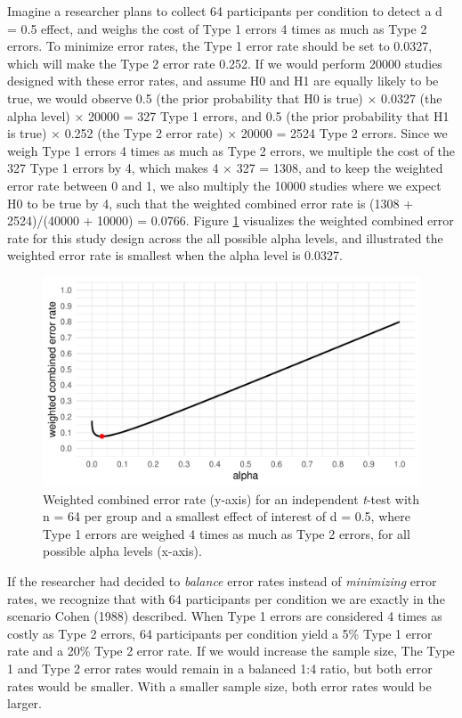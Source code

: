 \documentclass[
  english,
  ,man, a4paper,floatsintext]{apa6}
\begin{document}
Imagine a researcher plans to collect 64 participants per condition to detect a d = 0.5 effect, and weighs the cost of Type 1 errors 4 times as much as Type 2 errors. To minimize error rates, the Type 1 error rate should be set to 0.0327, which will make the Type 2 error rate 0.252. If we would perform 20000 studies designed with these error rates, and assume H0 and H1 are equally likely to be true, we would observe 0.5 (the prior probability that H0 is true) × 0.0327 (the alpha level) × 20000 = 327 Type 1 errors, and 0.5 (the prior probability that H1 is true) × 0.252 (the Type 2 error rate) × 20000 = 2524 Type 2 errors. Since we weigh Type 1 errors 4 times as much as Type 2 errors, we multiple the cost of the 327 Type 1 errors by 4, which makes 4 × 327 = 1308, and to keep the weighted error rate between 0 and 1, we also multiply the 10000 studies where we expect H0 to be true by 4, such that the weighted combined error rate is (1308 + 2524)/(40000 + 10000) = 0.0766. Figure \ref{fig:cost-plot} visualizes the weighted combined error rate for this study design across the all possible alpha levels, and illustrated the weighted error rate is smallest when the alpha level is 0.0327.

\begin{figure}
\centering
\includegraphics{Justify_in_Practice_files/figure-latex/cost-plot-1.pdf}
\caption{\label{fig:cost-plot}Weighted combined error rate (y-axis) for an independent \emph{t}-test with n = 64 per group and a smallest effect of interest of d = 0.5, where Type 1 errors are weighed 4 times as much as Type 2 errors, for all possible alpha levels (x-axis).}
\end{figure}

If the researcher had decided to \emph{balance} error rates instead of \emph{minimizing} error rates, we recognize that with 64 participants per condition we are exactly in the scenario Cohen (1988) described. When Type 1 errors are considered 4 times as costly as Type 2 errors, 64 participants per condition yield a 5\% Type 1 error rate and a 20\% Type 2 error rate. If we would increase the sample size, The Type 1 and Type 2 error rates would remain in a balanced 1:4 ratio, but both error rates would be smaller. With a smaller sample size, both error rates would be larger.
\end{document}

